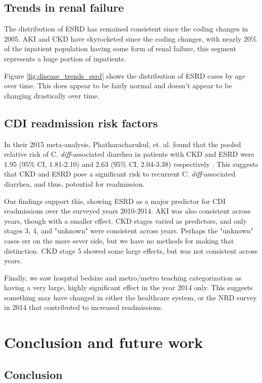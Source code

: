 \documentclass[12pt]{ociamthesis}\usepackage[]{graphicx}\usepackage[]{color}
\newcommand{\cdiff}{C. \textit{diff}}
\newcommand{\ci}[3]{#1 (95\% CI, #2-#3)}
\begin{document}
\section{Trends in renal failure}


The distribution of ESRD has remained consistent since the coding changes in 2005. AKI and CKD have skyrocketed since the coding changes,
with nearly 20\% of the inpatient population having some form of renal failure, this segment represents a huge portion of inpatients.

Figure \ref{fig:disease_trends_esrd} shows the distribution of ESRD cases by age over time. 
This does appear to be fairly normal and doesn't appear to be changing drastically over time.


\section{CDI readmission risk factors}

In their 2015 meta-analysis, Phatharacharukul, et. al. found that the pooled relative risk of \cdiff-associated diarrhea
in patients with CKD and ESRD were \ci{1.95}{1.81}{2.10} and \ci{2.63}{2.04}{3.38} respectively \cite{Phatharacharukul2015}.
This suggests that CKD and ESRD pose a significant risk to recurrent \cdiff-associated diarrhea, and thus, potential for readmission.

Our findings support this, showing ESRD as a major predictor for CDI readmissions over the surveyed years 2010-2014. 
AKI was also consistent across years, though with a smaller effect.
CKD stages varied as predictors, and only stages 3, 4, and "unknown" were consistent across years. Perhaps the "unknown" cases
err on the more sever side, but we have no methods for making that distinction. 
CKD stage 5 showed some large effects, but was not consistent across years. 

Finally, we saw hospital bedsize and metro/metro teaching categorization as having a very large, highly significant effect
in the year 2014 only. This suggests something may have changed in either the healthcare system, or the NRD survey in 2014 that contributed to 
increased readmissions. 

\chapter{Conclusion and future work}


\section{Conclusion}
\end{document}
